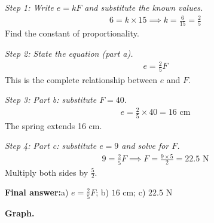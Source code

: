 \documentclass[11pt]{article}
\begin{document}
\textit{Step 1: Write \( e = kF \) and substitute the known values.}
\[\begin{gathered}
6 = k \times 15 \implies k = \frac{6}{15} = \frac{2}{5}
\end{gathered}\]
Find the constant of proportionality.

\textit{Step 2: State the equation (part a).}
\[\begin{gathered}
e = \frac{2}{5}F
\end{gathered}\]
This is the complete relationship between \( e \) and \( F \).

\textit{Step 3: Part b: substitute \( F = 40 \).}
\[\begin{gathered}
e = \frac{2}{5} \times 40 = 16 \text{ cm}
\end{gathered}\]
The spring extends 16 cm.

\textit{Step 4: Part c: substitute \( e = 9 \) and solve for \( F \).}
\[\begin{gathered}
9 = \frac{2}{5}F \implies F = \frac{9 \times 5}{2} = 22.5 \text{ N}
\end{gathered}\]
Multiply both sides by \( \frac{5}{2} \).

\begin{answerbox}
\textbf{Final answer:}\quad a) \(\displaystyle e = \frac{2}{5}F\); b) \(\displaystyle 16\) cm; c) \(\displaystyle 22.5\) N
\end{answerbox}
\textbf{Graph.}
\end{document}
